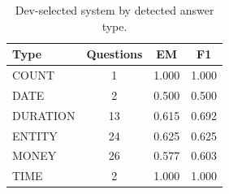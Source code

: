 \begin{table}[H]
\centering
\small
\caption{Dev-selected system by detected answer type.}
\label{tab:qatype}
\begin{tabular}{lccc}
\toprule
Type & Questions & EM & F1 \\
\midrule
COUNT & 1 & 1.000 & 1.000 \\
DATE & 2 & 0.500 & 0.500 \\
DURATION & 13 & 0.615 & 0.692 \\
ENTITY & 24 & 0.625 & 0.625 \\
MONEY & 26 & 0.577 & 0.603 \\
TIME & 2 & 1.000 & 1.000 \\
\bottomrule
\end{tabular}
\end{table}